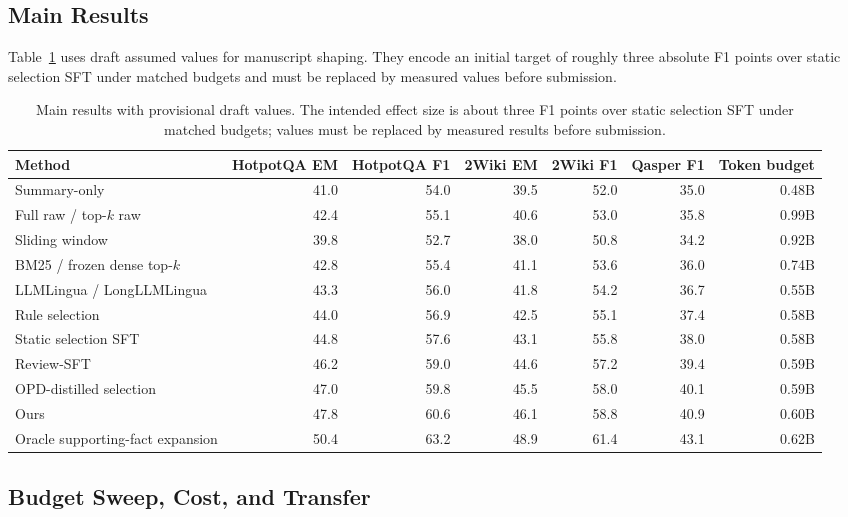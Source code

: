\documentclass[11pt]{article}
\begin{document}
\subsection{Main Results}

Table~\ref{tab:main-results} uses draft assumed values for manuscript shaping. They encode an initial target of roughly three absolute F1 points over static selection SFT under matched budgets and must be replaced by measured values before submission.

\begin{table}[t]
\centering
\small
\begin{tabular}{lrrrrrr}
\toprule
Method & HotpotQA EM & HotpotQA F1 & 2Wiki EM & 2Wiki F1 & Qasper F1 & Token budget \\
\midrule
Summary-only & 41.0 & 54.0 & 39.5 & 52.0 & 35.0 & 0.48B \\
Full raw / top-$k$ raw & 42.4 & 55.1 & 40.6 & 53.0 & 35.8 & 0.99B \\
Sliding window & 39.8 & 52.7 & 38.0 & 50.8 & 34.2 & 0.92B \\
BM25 / frozen dense top-$k$ & 42.8 & 55.4 & 41.1 & 53.6 & 36.0 & 0.74B \\
LLMLingua / LongLLMLingua & 43.3 & 56.0 & 41.8 & 54.2 & 36.7 & 0.55B \\
Rule selection & 44.0 & 56.9 & 42.5 & 55.1 & 37.4 & 0.58B \\
Static selection SFT & 44.8 & 57.6 & 43.1 & 55.8 & 38.0 & 0.58B \\
Review-SFT & 46.2 & 59.0 & 44.6 & 57.2 & 39.4 & 0.59B \\
OPD-distilled selection & 47.0 & 59.8 & 45.5 & 58.0 & 40.1 & 0.59B \\
Ours & 47.8 & 60.6 & 46.1 & 58.8 & 40.9 & 0.60B \\
Oracle supporting-fact expansion & 50.4 & 63.2 & 48.9 & 61.4 & 43.1 & 0.62B \\
\bottomrule
\end{tabular}
\caption{Main results with provisional draft values. The intended effect size is about three F1 points over static selection SFT under matched budgets; values must be replaced by measured results before submission.}
\label{tab:main-results}
\end{table}

\subsection{Budget Sweep, Cost, and Transfer}
\end{document}
